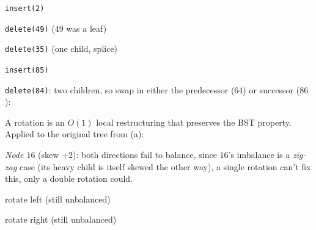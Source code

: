 \documentclass[12pt,twoside]{article}
\begin{document}
\begin{problems}
\begin{problemparts}
\begin{center}
\hfill\texttt{insert(2)}
\end{center}
\begin{center}
\hfill\texttt{delete(49)} (49 was a leaf)
\end{center}
\begin{center}
\hfill\texttt{delete(35)} (one child, splice)
\end{center}
\begin{center}
\hfill\texttt{insert(85)}
\end{center}
\texttt{delete(84)}: two children, so swap in either the predecessor
($64$) or successor ($86$):
\begin{center}
\hspace{1cm}
\end{center}

\problempart %
A rotation is an $O(1)$ local restructuring that preserves the BST
property. Applied to the original tree from (a):

\emph{Node $16$} (skew $+2$): both directions fail to balance, since
$16$'s imbalance is a \emph{zig-zag} case (its heavy child is itself
skewed the other way), a single rotation can't fix this, only a
double rotation could.
\begin{center}
\hfill rotate left (still unbalanced)
\end{center}
\begin{center}
\hfill rotate right (still unbalanced)
\end{center}


\end{problemparts}
\end{problems}
\end{document}
